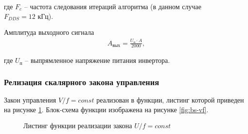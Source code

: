         где $F_c$ -- частота следования итераций алгоритма (в данном случае \\
        $F_{DDS} = 12$ кГц).

        Амплитуда выходного сигнала
        \begin{gather*}
            A_\text{вых} = \frac{U_\text{п} \cdot A}{2000},
        \end{gather*}

        где $U_\text{п}$ -- выпрямленное напряжение питания инвертора. 

    \subsubsection{Релизация скалярного закона управления}
        Закон управления $V/f = const$ реализован в функции, листинг которой приведен на рисунке \ref{fig:listing-vf}.
        Блок-схема функции изображена на рисунке \ref{fig:bs-vf}.

        \begin{figure}[h!]
            \caption{Листинг функции реализации закона $U/f = const$}
            \label{fig:listing-vf}
        \end{figure}

